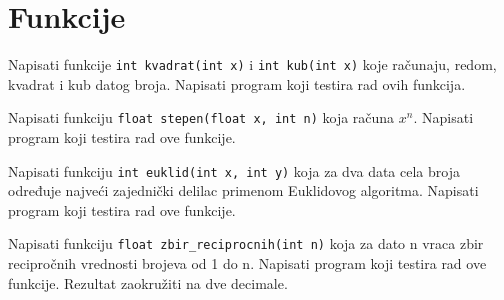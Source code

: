 \section{Funkcije}



\begin{Exercise}[label=v1.4_01] 
Napisati funkcije
\verb|int kvadrat(int x)| i \verb|int kub(int x)|
koje računaju, redom,  kvadrat i kub datog broja. Napisati program koji testira rad ovih funkcija.\\ 
\end{Exercise}
\begin{Answer}[ref=v1.4_01]
\end{Answer}

\begin{Exercise}[label=v1.4_02] 
Napisati funkciju
\verb|float stepen(float x, int n)|
koja računa $x^n$. Napisati program koji testira rad ove funkcije.\\ 
\end{Exercise}
\begin{Answer}[ref=v1.4_02]
\end{Answer}

\begin{Exercise}[label=v1.4_03] 
Napisati funkciju 
\verb|int euklid(int x, int y)|
koja za dva data cela broja određuje
  najveći zajednički delilac primenom Euklidovog algoritma. Napisati program
  koji testira rad ove funkcije.\\ 
\end{Exercise}
\begin{Answer}[ref=v1.4_03]
\end{Answer}

\begin{Exercise}[label=v1.4_04] 
Napisati funkciju 
\verb|float zbir_reciprocnih(int n)|
koja za dato n vraca zbir recipročnih vrednosti brojeva od 1 do n.
Napisati program koji testira rad ove funkcije. Rezultat zaokružiti
na dve decimale.\\ 
\end{Exercise}
\begin{Answer}[ref=v1.4_04]
\end{Answer}

